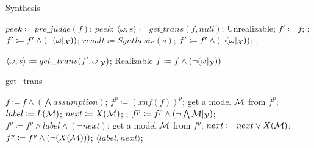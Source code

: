 \begin{algorithm}
\caption{Synthesis}
\label{algo:newSyn}
	\begin{algorithmic}[1]
		
		\STATE $peek\coloneqq pre\_judge(f)$;
    		\RETURN $peek$;
    	\ENDIF
    		\STATE $\langle \omega,s\rangle\coloneqq get\_trans(f,null)$;
        		\RETURN Unrealizable;
    		\ENDIF
    	\STATE $f'\coloneqq f$;
            	\BREAK;
            \ENDIF
            	\STATE $f'\coloneqq f'\wedge(\neg(\omega|_{\mathcal{X}}))$;
        	\ELSE
            	\STATE $result\coloneqq Synthesis(s)$;
                	\STATE $f'\coloneqq f'\wedge(\neg(\omega|_{\mathcal{X}}))$;
            	\ELSE
                	\BREAK;
            	\ENDIF
        
        	\ENDIF
        	\STATE $\langle\omega,s\rangle\coloneqq get\_trans(f',\omega|_{\mathcal{Y}})$;
            	\RETURN Realizable\;
        	\ENDIF
    	\ENDWHILE
    	\STATE $f\coloneqq f\wedge(\neg(\omega|_{\mathcal{Y}}))$\;
	\ENDWHILE
	\end{algorithmic}
\end{algorithm}


\begin{algorithm}
\caption{get\_trans}
	\begin{algorithmic}
	
	\STATE $f\coloneqq f\wedge\left(\bigwedge assumption\right)$;
	\STATE $f^p\coloneqq(xnf(f))^p$;
    	\STATE get a model $\mathcal{M}$ from $f^p$;
        	\STATE $label\coloneqq L(\mathcal{M})$;
        	\STATE $next\coloneqq X(\mathcal{M})$;
        	\BREAK;
    	\ENDIF
    	\STATE $f^p\coloneqq f^p\wedge\left(\neg\bigwedge\mathcal{M}|_{\mathcal{Y}}\right)$;
	\ENDWHILE
	\STATE $f^p\coloneqq f^p\wedge label\wedge(\neg next)$;
    	\STATE get a model $\mathcal{M}$ from $f^p$;
    	\STATE $next\coloneqq next\vee X(\mathcal{M})$;
    	\STATE $f^p\coloneqq f^p\wedge(\neg (X(\mathcal{M})))$;
	\ENDWHILE
	\RETURN $\langle label,next\rangle$;
	\end{algorithmic}
\end{algorithm}


